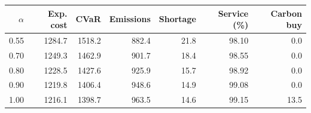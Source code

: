 \begin{tabular}{rrrrrrr}
\toprule
$\alpha$ & Exp. cost & CVaR & Emissions & Shortage & Service (\%) & Carbon buy \\
\midrule
0.55 & 1284.7 & 1518.2 & 882.4 & 21.8 & 98.10 & 0.0 \\
0.70 & 1249.3 & 1462.9 & 901.7 & 18.4 & 98.55 & 0.0 \\
0.80 & 1228.5 & 1427.6 & 925.9 & 15.7 & 98.92 & 0.0 \\
0.90 & 1219.8 & 1406.4 & 948.6 & 14.9 & 99.08 & 0.0 \\
1.00 & 1216.1 & 1398.7 & 963.5 & 14.6 & 99.15 & 13.5 \\
\bottomrule
\end{tabular}
